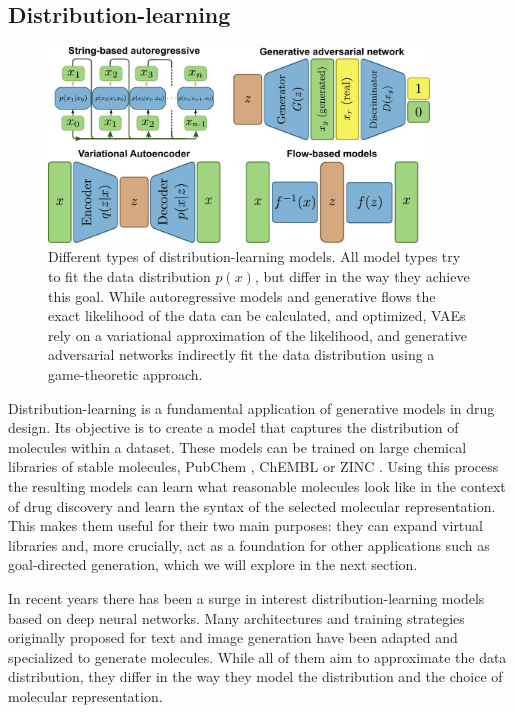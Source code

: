 \subsection{Distribution-learning}
\begin{figure}
      \centering
      \includegraphics[width=0.9\textwidth]{figures/distribution-learning-models.pdf}
      \caption{Different types of distribution-learning models. All model types
            try to fit the data distribution $p(x)$, but differ in the way they achieve this goal.
            While autoregressive models and generative flows the exact likelihood of the data can be calculated,
            and optimized, VAEs rely on a variational approximation of the likelihood, and generative adversarial networks
            indirectly fit the data distribution using a game-theoretic approach. \label{fig:distribution-learning-models}}
\end{figure}
Distribution-learning is a fundamental application of generative models in drug design. Its
objective is to create a model that captures the distribution of molecules within a dataset. These
models can be trained on large chemical libraries of stable molecules, PubChem
\citep{kimPubChemSubstanceCompound2016}, ChEMBL \citep{bentoChEMBLBioactivityDatabase2014} or ZINC
\citep{irwinZINCFreeTool2012}. Using this process the resulting models can learn what reasonable
molecules look like in the context of drug discovery and learn the syntax of the selected molecular
representation. This makes them useful for their two main purposes: they can expand virtual
libraries and, more crucially, act as a foundation for other applications such as goal-directed
generation, which we will explore in the next section.

In recent years there has been a surge in interest distribution-learning models based on deep neural
networks. Many architectures and training strategies originally proposed for text and image
generation have been adapted and specialized to generate molecules. While all of them aim to
approximate the data distribution, they differ in the way they model the distribution and the choice
of molecular representation.

